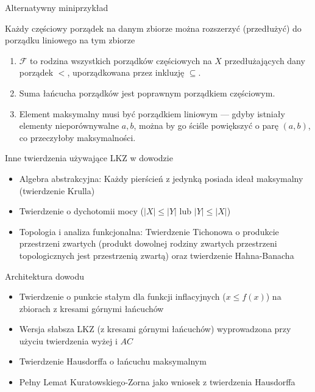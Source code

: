 \documentclass[aspectratio=169,11pt,t,envcountsect,professionalfonts]{beamer}
\begin{document}
\begin{frame}{Alternatywny miniprzykład}
    \begin{mythm}
     Każdy częściowy porządek na danym zbiorze można rozszerzyć (przedłużyć) do porządku liniowego na tym zbiorze   
    \end{mythm}
\begin{enumerate}

    \item $\mathcal{F}$ to rodzina wszystkich porządków częściowych na $X$ przedłużających dany porządek $<$, uporządkowana przez inkluzję $\subseteq$.
    \item Suma łańcucha porządków jest poprawnym porządkiem częściowym.
    \item Element maksymalny musi być porządkiem liniowym — gdyby istniały elementy nieporównywalne $a, b$, można by go ściśle powiększyć o parę $(a, b)$, co przeczyłoby maksymalności.
\end{enumerate}   
\end{frame}
\begin{frame}{Inne twierdzenia używające LKZ w dowodzie}
\begin{itemize}
    \item Algebra abstrakcyjna: Każdy pierścień z jedynką posiada ideał maksymalny (twierdzenie Krulla)
    \item Twierdzenie o dychotomii mocy ($|X| \leqslant |Y|$ lub $|Y| \leqslant |X|$)
    \item Topologia i analiza funkcjonalna: Twierdzenie Tichonowa o produkcie przestrzeni zwartych (produkt  dowolnej rodziny zwartych przestrzeni topologicznych jest przestrzenią zwartą) oraz twierdzenie Hahna-Banacha
\end{itemize}
    
\end{frame}


\begin{frame}{Architektura dowodu}
\begin{itemize}
    \item Twierdzenie o punkcie stałym dla funkcji inflacyjnych ($x \leqslant f(x)$) na zbiorach z kresami górnymi łańcuchów
    \item Wersja słabsza LKZ (z kresami górnymi łańcuchów) wyprowadzona przy użyciu twierdzenia wyżej i $AC$
    \item Twierdzenie Hausdorffa o łańcuchu maksymalnym
    \item Pełny Lemat Kuratowskiego-Zorna jako wniosek z twierdzenia Hausdorffa
\end{itemize}
\end{frame}
\end{document}
